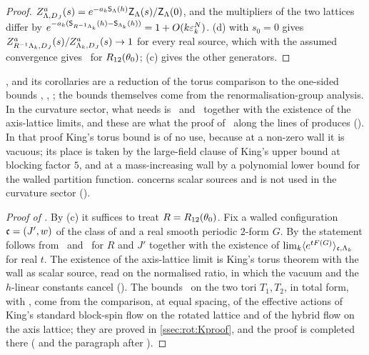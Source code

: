 \begin{proof}
$Z^a_{\Lambda,D_J}(s)=e^{-a_k\mathsf S_\Lambda(h)}\mathsf Z_\Lambda(s)/\mathsf Z_\Lambda(0)$, and the multipliers of the two lattices differ by $e^{-a_k(\mathsf S_{R^{-1}\Lambda_k}(h)-\mathsf S_{\Lambda_k}(h))}=1+O(k\varepsilon_k^N)$. (d) with $s_0=0$ gives $Z^a_{R^{-1}\Lambda_k,D_J}(s)/Z^a_{\Lambda_k,D_J}(s)\to1$ for every real source, which with the assumed convergence gives \Ka\ for $R_{12}(\theta_0)$; (c) gives the other generators.
\end{proof}

\begin{remark}\label{rot:rem:closing}
,  and its corollaries are a reduction of the torus comparison to the one-sided bounds \hypF, \hypV, \hypCc; the bounds themselves come from the renormalisation-group analysis. In the curvature sector, what  needs is \hypFz\ and \hypV\ together with the existence of the axis-lattice limits, and these are what the proof of \Kz\ along the lines of \cite{K2} produces (). In that proof King's torus bound \cite[(4.2)]{K2} is of no use, because at a non-zero wall it is vacuous; its place is taken by the large-field clause of King's upper bound \cite[Thm.~3.1, (3.4)]{K1} at blocking factor $5$, and at a mass-increasing wall by a polynomial lower bound for the walled partition function.  concerns scalar sources and is not used in the curvature sector ().
\end{remark}

\begin{proof}[Proof of ]
By (c) it suffices to treat $R=R_{12}(\theta_0)$. Fix a walled configuration $\mathfrak c=(J',w)$ of the class of  and a real smooth periodic $2$-form $G$. By  the statement follows from \hypFz\ and \hypV\ for $R$ and $J'$ together with the existence of $\lim_k\langle e^{tF(G)}\rangle_{\mathfrak c,\Lambda_k}$ for real $t$. The existence of the axis-lattice limit is King's torus theorem \cite[Thm.~2.1]{K1} with the wall as scalar source, read on the normalised ratio, in which the vacuum and the $h$-linear constants cancel (). The bounds \hypFz\ on the two tori $T_1,T_2$, in total form, with \hypV, come from the comparison, at equal spacing, of the effective actions of King's standard block-spin flow on the rotated lattice and of the hybrid flow on the axis lattice; they are proved in \cref{ssec:rot:Kproof}, and the proof is completed there ( and the paragraph after ).
\end{proof}

